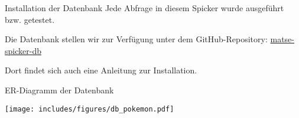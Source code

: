 \documentclass[german]{spicker}
\begin{document}
\begin{info}{Installation der Datenbank}
    Jede Abfrage in diesem Spicker wurde ausgeführt bzw. getestet.

    Die Datenbank stellen wir zur Verfügung unter dem GitHub-Repository: \href{https://github.com/pblan/matse-spicker-db}{matse-spicker-db}

    Dort findet sich auch eine Anleitung zur Installation.
\end{info}

\begin{info}{ER-Diagramm der Datenbank}
    \begin{center}
        \texttt{[image: includes/figures/db\_pokemon.pdf]}
    \end{center}
\end{info}

















\printindex
\printindex[SQL]
\printindex[Beispiele]

\printbibliography
\end{document}
